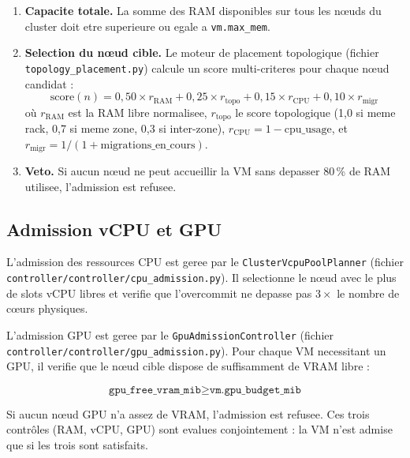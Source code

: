 \begin{enumerate}
    \item \textbf{Capacite totale.} La somme des RAM disponibles sur tous les n\oe{}uds du cluster doit etre superieure ou egale a \texttt{vm.max\_mem}.
    \item \textbf{Selection du n\oe{}ud cible.} Le moteur de placement topologique (fichier \texttt{topology\_placement.py}) calcule un score multi-criteres pour chaque n\oe{}ud candidat :
    \begin{equation}
        \label{eq:placement-score}
        \text{score}(n) = 0{,}50 \times r_{\text{RAM}} + 0{,}25 \times r_{\text{topo}} + 0{,}15 \times r_{\text{CPU}} + 0{,}10 \times r_{\text{migr}}
    \end{equation}
    o\`u $r_{\text{RAM}}$ est la RAM libre normalisee, $r_{\text{topo}}$ le score topologique (1,0 si meme rack, 0,7 si meme zone, 0,3 si inter-zone), $r_{\text{CPU}} = 1 - \text{cpu\_usage}$, et $r_{\text{migr}} = 1 / (1 + \text{migrations\_en\_cours})$.
    \item \textbf{Veto.} Si aucun n\oe{}ud ne peut accueillir la VM sans depasser 80\,\% de RAM utilisee, l'admission est refusee.
\end{enumerate}

\subsection{Admission vCPU et GPU}
\label{subsec:admission-cpu-gpu}

L'admission des ressources CPU est geree par le \texttt{ClusterVcpuPoolPlanner} (fichier \texttt{controller/controller/cpu\_admission.py}). Il selectionne le n\oe{}ud avec le plus de slots vCPU libres et verifie que l'overcommit ne depasse pas $3\times$ le nombre de c\oe{}urs physiques.

L'admission GPU est geree par le \texttt{GpuAdmissionController} (fichier \texttt{controller/controller/gpu\_admission.py}). Pour chaque VM necessitant un GPU, il verifie que le n\oe{}ud cible dispose de suffisamment de VRAM libre :

\begin{equation}
    \texttt{gpu\_free\_vram\_mib} \geq \texttt{vm.gpu\_budget\_mib}
\end{equation}

Si aucun n\oe{}ud GPU n'a assez de VRAM, l'admission est refusee. Ces trois contr\^oles (RAM, vCPU, GPU) sont evalues conjointement : la VM n'est admise que si les trois sont satisfaits.

